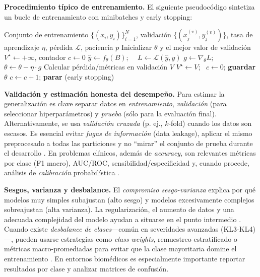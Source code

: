 \documentclass[11pt,spanish,listoffigures,listoftables]{tfgetsinf}
\begin{document}
\noindent \textbf{Procedimiento típico de entrenamiento.} El siguiente pseudocódigo sintetiza un bucle de entrenamiento con minibatches y early stopping:
\begin{algorithmic}
    \REQUIRE Conjunto de entrenamiento $\{(x_i,y_i)\}_{i=1}^N$, validación $\{(x_j^{(v)},y_j^{(v)})\}$, tasa de aprendizaje $\eta$, pérdida $\mathcal{L}$, paciencia $p$
    \STATE Inicializar $\theta$ y el mejor valor de validación $V^\star \leftarrow +\infty$, contador $c\leftarrow0$
            \STATE $\hat{y} \leftarrow f_\theta(B)$; \ \ $L \leftarrow \mathcal{L}(\hat{y}, y)$
            \STATE $g \leftarrow \nabla_\theta L$; \ \ $\theta \leftarrow \theta - \eta \cdot g$
        \ENDFOR
        \STATE Calcular pérdida/métricas en validación $V$
         \STATE $V^\star \leftarrow V$; \ $c\leftarrow 0$; \textbf{guardar} $\theta$
        \ELSE \STATE $c\leftarrow c+1$;  \STATE \textbf{parar} (early stopping) \ENDIF
        \ENDIF
    \ENDFOR
\end{algorithmic}

\noindent \textbf{Validación y estimación honesta del desempeño.} Para estimar la generalización es clave separar datos en \textit{entrenamiento}, \textit{validación} (para seleccionar hiperparámetros) y \textit{prueba} (sólo para la evaluación final). Alternativamente, se usa \textit{validación cruzada} (p. ej., $k$-fold) cuando los datos son escasos. Es esencial evitar \textit{fugas de información} (data leakage), aplicar el mismo preprocesado a todas las particiones y no “mirar” el conjunto de prueba durante el desarrollo \cite{Bishop2006}. En problemas clínicos, además de \textit{accuracy}, son relevantes métricas por clase (F1 macro), AUC/ROC, sensibilidad/especificidad y, cuando procede, análisis de \textit{calibración} probabilística \cite{Bishop2006}.


\noindent \textbf{Sesgos, varianza y desbalance.} El \textit{compromiso sesgo-varianza} explica por qué modelos muy simples subajustan (alto sesgo) y modelos excesivamente complejos sobreajustan (alta varianza). La regularización, el aumento de datos y una adecuada complejidad del modelo ayudan a situarse en el punto intermedio \cite{Bishop2006}. Cuando existe \textit{desbalance de clases}—común en severidades avanzadas (KL3-KL4)—, pueden usarse estrategias como \textit{class weights}, remuestreo estratificado o métricas macro-promediadas para evitar que la clase mayoritaria domine el entrenamiento \cite{Bishop2006}. En entornos biomédicos es especialmente importante reportar resultados por clase y analizar matrices de confusión.
\end{document}
